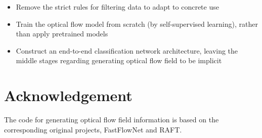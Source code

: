 \documentclass[10pt, a4paper, twocolumn]{article}
\begin{document}
    \begin{itemize}[noitemsep, topsep=0pt]
    \item Remove the strict rules for filtering data to adapt to concrete use
    \item Train the optical flow model from scratch (by self-supervised learning), rather than apply pretrained models
    \item Construct an end-to-end classification network architecture, leaving the middle stages regarding generating optical flow field to be implicit
    \end{itemize}


\section*{\large Acknowledgement}
    
    The code for generating optical flow field information is based on the corresponding original projects, FastFlowNet and RAFT.



\end{document}
